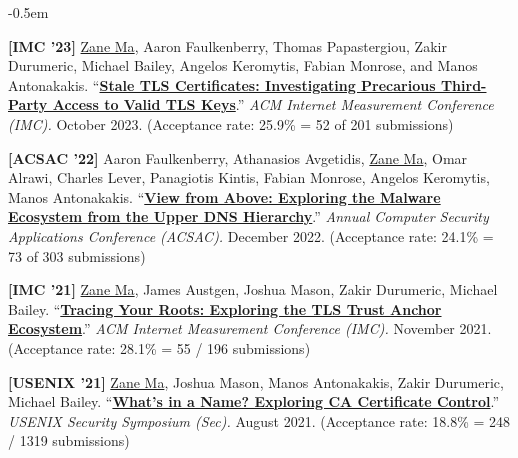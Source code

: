 \documentclass[10pt,singlecolumn]{article} %
\begin{document}
\begin{etaremune}
\itemsep -0.5em 

\item \textbf{[IMC '23]} 
\underline{Zane Ma}, Aaron Faulkenberry, Thomas Papastergiou, Zakir Durumeric, Michael Bailey, Angelos Keromytis, Fabian Monrose, and Manos Antonakakis.
``\textbf{\href{}{Stale TLS Certificates: Investigating Precarious Third-Party Access to Valid TLS Keys}}.''
\emph{ACM Internet Measurement Conference (IMC).} October 2023.
(Acceptance rate: 25.9\% = 52 of 201 submissions)
\vspace{6pt}



\item \textbf{[ACSAC '22]} 
Aaron Faulkenberry, Athanasios Avgetidis, \underline{Zane Ma}, Omar Alrawi, Charles Lever, Panagiotis Kintis, Fabian Monrose, Angelos Keromytis, Manos Antonakakis.
``\textbf{\href{https://zanema.com/papers/acsac22_authdns.pdf}{View from Above: Exploring the Malware Ecosystem from the Upper DNS Hierarchy}}.''
\emph{Annual Computer Security Applications Conference (ACSAC).} December 2022.
(Acceptance rate: 24.1\% = 73 of 303 submissions)
\vspace{6pt}



\item \textbf{[IMC '21]} 
\underline{Zane Ma}, James Austgen, Joshua Mason, Zakir Durumeric, Michael Bailey.
``\textbf{\href{https://zanema.com/papers/imc21_roots.pdf}{Tracing Your Roots: Exploring the TLS Trust Anchor Ecosystem}}.''
\emph{ACM Internet Measurement Conference (IMC).} November 2021.
(Acceptance rate: 28.1\% = 55 / 196 submissions)
\vspace{6pt}


\item \textbf{[USENIX '21]}
\underline{Zane Ma}, Joshua Mason, Manos Antonakakis, Zakir Durumeric, Michael Bailey.
``\textbf{\href{https://zanema.com/papers/usenix21_ca_operators.pdf}{What's in a Name? Exploring CA Certificate Control}}.''
\emph{USENIX Security Symposium (Sec).} August 2021.
(Acceptance rate: 18.8\% = 248 / 1319 submissions)  
\vspace{6pt}



\end{etaremune}
\end{document}
